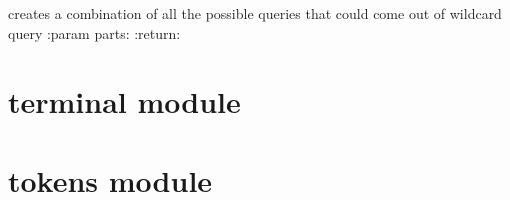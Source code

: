 \documentclass[letterpaper,10pt,english]{sphinxmanual}
\begin{document}

\begin{fulllineitems}
\label{\detokenize{ngrams:ngrams.query_combinations}}
creates a combination of all the possible queries
that could come out of wildcard query
:param parts:
:return:

\end{fulllineitems}



\chapter{terminal module}
\label{\detokenize{terminal:terminal-module}}\label{\detokenize{terminal::doc}}\label{\detokenize{terminal:module-terminal}}

\begin{fulllineitems}
\label{\detokenize{terminal:terminal.clear_console}}
\end{fulllineitems}


\begin{fulllineitems}
\label{\detokenize{terminal:terminal.results_menu}}
\end{fulllineitems}


\begin{fulllineitems}
\label{\detokenize{terminal:terminal.show_results}}
\end{fulllineitems}



\chapter{tokens module}
\label{\detokenize{tokens:module-tokens}}\label{\detokenize{tokens::doc}}\label{\detokenize{tokens:tokens-module}}
\end{document}
